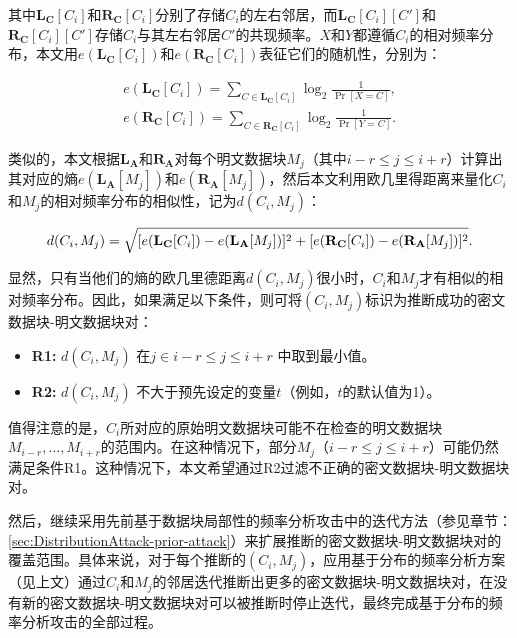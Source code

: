 其中$\mathbf{L_C}[C_i]$和$\mathbf{R_C}[C_i]$分别了存储$C_i$的左右邻居，而$\mathbf{L_C}[C_i][C']$和$\mathbf{R_C}[C_i][C']$存储$C_i$与其左右邻居$C'$的共现频率。$X$和$Y$都遵循$C_i$的相对频率分布，本文用$e(\mathbf{L_C}[C_i])$和$e(\mathbf{R_C}[C_i])$表征它们的随机性，分别为：

\begin{eqnarray*}
    e(\mathbf{L_C}[C_i]) = \sum_{C \in \mathbf{L_C}[C_i]} \log_2\frac{1}{\Pr[X = C]}, \\
    e(\mathbf{R_C}[C_i]) = \sum_{C \in \mathbf{R_C}[C_i]} \log_2\frac{1}{\Pr[Y = C]}. 
\end{eqnarray*}

类似的，本文根据$\mathbf{L_A}$和$\mathbf{R_A}$对每个明文数据块$M_j$（其中$i-r\le j\le i+r$）计算出其对应的熵$e(\mathbf{L_A}[M_j])$和$e(\mathbf{R_A}[M_j])$，然后本文利用欧几里得距离来量化$C_i$和$M_j$的相对频率分布的相似性，记为$d(C_i, M_j)$：

\begin{equation}
    \label{eq:dis-dcm}
    \centering
    d(C_i, M_j) = \sqrt{[e(\mathbf{L_C}[C_i]) - e(\mathbf{L_A}[M_j])]^2 + [e(\mathbf{R_C}[C_i]) - e(\mathbf{R_A}[M_j])]^2}.
\end{equation}

显然，只有当他们的熵的欧几里德距离$d(C_i, M_j)$很小时，$C_i$和$M_j$才有相似的相对频率分布。因此，如果满足以下条件，则可将$(C_i, M_j)$标识为推断成功的密文数据块-明文数据块对：

\begin{itemize}
\item \textbf{R1:} $d(C_i, M_j)$ 在$j \in i-r \leq j \leq i+r$ 中取到最小值。
\item \textbf{R2:} $d(C_i, M_j)$ 不大于预先设定的变量$t$（例如，$t$的默认值为1）。
\end{itemize}

值得注意的是，$C_i$所对应的原始明文数据块可能不在检查的明文数据块$M_{i-r}, \ldots, M_{i+r}$的范围内。在这种情况下，部分$M_j$（$i-r \leq j \leq i+r$）可能仍然满足条件R1。这种情况下，本文希望通过R2过滤不正确的密文数据块-明文数据块对。 

然后，继续采用先前基于数据块局部性的频率分析攻击中的迭代方法（参见章节：\ref{sec:DistributionAttack-prior-attack}）来扩展推断的密文数据块-明文数据块对的覆盖范围。具体来说，对于每个推断的$(C_i, M_j)$，应用基于分布的频率分析方案（见上文）通过$C_i$和$M_j$的邻居迭代推断出更多的密文数据块-明文数据块对，在没有新的密文数据块-明文数据块对可以被推断时停止迭代，最终完成基于分布的频率分析攻击的全部过程。
 
